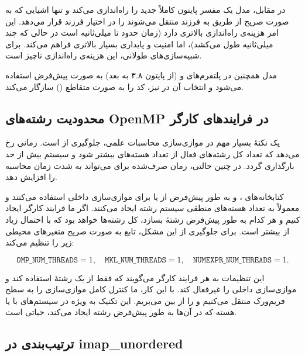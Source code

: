 در مقابل، مدل  یک مفسر پایتون کاملاً جدید را راه‌اندازی می‌کند و تنها اشیایی که به صورت صریح از طریق  به فرزند منتقل می‌شوند را در اختیار فرزند قرار می‌دهد. این امر هزینه‌ی راه‌اندازی بالاتری دارد (زمان  حدود  تا  میلی‌ثانیه است در حالی که  چند میلی‌ثانیه طول می‌کشد)، اما امنیت و پایداری بسیار بالاتری فراهم می‌کند. برای شبیه‌سازی‌های طولانی، این هزینه‌ی راه‌اندازی ناچیز است.

مدل  همچنین در پلتفرم‌های  و  (از پایتون ۳.۸ به بعد) به صورت پیش‌فرض استفاده می‌شود و انتخاب آن در  نیز، کد را به صورت متقاطع () سازگار می‌کند.

\subsection{محدودیت رشته‌های OpenMP در فرایندهای کارگر}

یک نکتۀ بسیار مهم در موازی‌سازی محاسبات علمی، جلوگیری از  است.  زمانی رخ می‌دهد که تعداد کل رشته‌های فعال از تعداد هسته‌های  بیشتر شود و سیستم بیش از حد بارگذاری گردد. در چنین حالتی، زمان صرف‌شده برای  می‌تواند به شدت زمان محاسبه را افزایش دهد.

کتابخانه‌های ،  و  به طور پیش‌فرض از  یا  برای موازی‌سازی داخلی استفاده می‌کنند و معمولاً به تعداد هسته‌های منطقی سیستم رشته ایجاد می‌کنند. اگر ما  فرایند کارگر ایجاد کنیم و هر کدام به طور پیش‌فرض  رشتۀ  بسازد، کل رشته‌ها  خواهد بود که با احتمال زیاد از  بیشتر است. برای جلوگیری از این مشکل، تابع  به صورت صریح متغیرهای محیطی زیر را تنظیم می‌کند:

\begin{equation}
	\texttt{OMP\_NUM\_THREADS} = 1, \quad \texttt{MKL\_NUM\_THREADS} = 1, \quad \texttt{NUMEXPR\_NUM\_THREADS} = 1.
\end{equation}

\noindent این تنظیمات به هر فرایند کارگر می‌گویند که فقط از یک رشتۀ  استفاده کند و موازی‌سازی داخلی را غیرفعال کند. با این کار، ما کنترل کامل موازی‌سازی را به سطح فریم‌ورک منتقل می‌کنیم و  را از بین می‌بریم. این تکنیک به ویژه در سیستم‌های با  یا  هسته که در آن‌ها  به طور پیش‌فرض  رشته ایجاد می‌کند، حیاتی است.

\subsection{ترتیب‌بندی در imap\_unordered}

